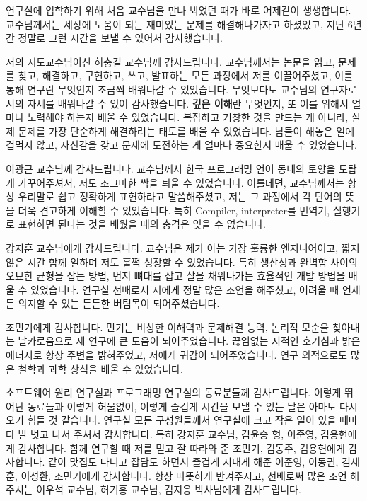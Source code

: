 \begin{acknowledgement}
  연구실에 입학하기 위해 처음 교수님을 만나 뵈었던 때가 바로 어제같이 생생합니다. 교수님께서는 세상에 도움이 되는 재미있는 문제를 해결해나가자고 하셨었고, 지난 6년간 정말로 그런 시간을 보낼 수 있어서 감사했습니다.

  저의 지도교수님이신 허충길 교수님께 감사드립니다.
  교수님께서는 논문을 읽고, 문제를 찾고, 해결하고, 구현하고, 쓰고, 발표하는 모든 과정에서 저를 이끌어주셨고, 이를 통해 연구란 무엇인지 조금씩 배워나갈 수 있었습니다.
  무엇보다도 교수님의 연구자로서의 자세를 배워나갈 수 있어 감사했습니다.
  \textbf{깊은 이해}란 무엇인지, 또 이를 위해서 얼마나 노력해야 하는지 배울 수 있었습니다.
  복잡하고 거창한 것을 만드는 게 아니라, 실제 문제를 가장 단순하게 해결하려는 태도를 배울 수 있었습니다.
  남들이 해놓은 일에 겁먹지 않고, 자신감을 갖고 문제에 도전하는 게 얼마나 중요한지 배울 수 있었습니다.

  이광근 교수님께 감사드립니다.
  교수님께서 한국 프로그래밍 언어 동네의 토양을 도탑게 가꾸어주셔서, 저도 조그마한 싹을 틔울 수 있었습니다.
  이를테면, 교수님께서는 항상 우리말로 쉽고 정확하게 표현하라고 말씀해주셨고, 저는 그 과정에서 각 단어의 뜻을 더욱 견고하게 이해할 수 있었습니다.
  특히 Compiler, interpreter를 번역기, 실행기로 표현하면 된다는 것을 배웠을 때의 충격은 잊을 수 없습니다.

  강지훈 교수님에게 감사드립니다.
  교수님은 제가 아는 가장 훌륭한 엔지니어이고, 짧지 않은 시간 함께 일하며 저도 훌쩍 성장할 수 있었습니다. 
  특히 생산성과 완벽함 사이의 오묘한 균형을 잡는 방법, 먼저 뼈대를 잡고 살을 채워나가는 효율적인 개발 방법을 배울 수 있었습니다.
  연구실 선배로서 저에게 정말 많은 조언을 해주셨고, 어려울 때 언제든 의지할 수 있는 든든한 버팀목이 되어주셨습니다.

  조민기에게 감사합니다.
  민기는 비상한 이해력과 문제해결 능력, 논리적 모순을 찾아내는 날카로움으로 제 연구에 큰 도움이 되어주었습니다.
  끊임없는 지적인 호기심과 밝은 에너지로 항상 주변을 밝혀주었고, 저에게 귀감이 되어주었습니다.
  연구 외적으로도 많은 철학과 과학 상식을 배울 수 있었습니다.

  소프트웨어 원리 연구실과 프로그래밍 연구실의 동료분들께 감사드립니다.
  이렇게 뛰어난 동료들과 이렇게 허물없이, 이렇게 즐겁게 시간을 보낼 수 있는 날은 아마도 다시 오기 힘들 것 같습니다.
  연구실 모든 구성원들께서 연구실에 크고 작은 일이 있을 때마다 발 벗고 나서 주셔서 감사합니다. 특히 강지훈 교수님, 김윤승 형, 이준영, 김용현에게 감사합니다.
  함께 연구할 때 저를 믿고 잘 따라와 준 조민기, 김동주, 김용현에게 감사합니다.
  같이 맛집도 다니고 잡담도 하면서 즐겁게 지내게 해준 이준영, 이동권, 김세훈, 이성환, 조민기에게 감사합니다.
  항상 따뜻하게 반겨주시고, 선배로써 많은 조언 해주시는 이우석 교수님, 허기홍 교수님, 김지응 박사님에게 감사드립니다.


\end{acknowledgement}

